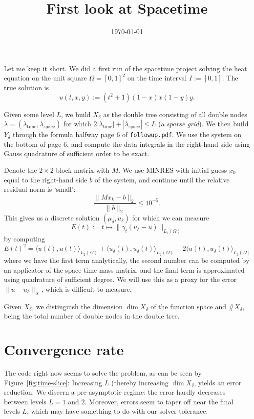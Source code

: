 \documentclass[11pt,a4paper]{amsart}
\date{\today}
\theoremstyle{definition}
\newcommand{\inp}[2]{\langle #1, #2 \rangle}
\begin{document}
\title{First look at Spacetime}
\maketitle

Let me keep it short. We did a first run of the spacetime project solving the
heat equation on the unit square $\Omega = [0,1]^2$ on the time interval
$I := [0,1]$. The true solution is 
\[
  u(t,x,y) := (t^2 + 1) (1-x)x(1-y)y.
\]

Given some level $L$, we build $X_\delta$ as the double tree consisting of all
double nodes $\lambda = (\lambda_{\text{time}}, \lambda_{\text{space}})$ for
which $2|\lambda_{\text{time}}| + |\lambda_{\text{space}}| \leq L$ (a \emph{sparse grid}).
We then build $Y_\delta$ through the formula halfway page 6 of \texttt{followup.pdf}.
We use the system on the bottom of page 6, and compute the data integrals in the
right-hand side using Gauss quadrature of sufficient order to be exact.

Denote the $2 \times 2$ block-matrix with $M$. We use MINRES with initial guess $x_0$
equal to the right-hand side $b$ of the system, and continue until the relative residual norm is `small':
\[
  \frac{\|Mx_k - b\|_2}{\|b\|_2} \leq 10^{-5}.
\]
This gives us a discrete solution $(\mu_\delta, u_\delta)$ for which we can measure
\[
  E(t) := t \mapsto \|\gamma_t(u_\delta - u)\|_{L_2(\Omega)}
\]
by computing
\[
  E(t)^2 = \inp{u(t)}{u(t)}_{L_2(\Omega)} + \inp{u_\delta(t)}{u_\delta(t)}_{L_2(\Omega)} - 2 \inp{u(t)}{u_\delta(t)}_{L_2(\Omega)}
\]
where we have the first term analytically, the second number can be computed by
an applicator of the space-time mass matrix, and the final term is approximated
using quadrature of sufficient degree. We will use this as a proxy for the error
$\|u - u_\delta\|_X$, which is difficult to measure.

Given $X_\delta$, we distinguish the dimension $\dim X_\delta$ of the function space
and $\# X_\delta$, being the total number of double nodes in the double tree.

\section*{Convergence rate}
The code right now seems to solve the problem, as can be seen by Figure~\ref{fig:time-slice}:
Increasing $L$ (thereby increasing $\dim X_\delta$, yields an error reduction.
We discern a pre-asymptotic regime: the error hardly decreases between levels $L=1$
and $2$. Moreover, errors seem to taper off near the final levels $L$, which may
have something to do with our solver tolerance.
\end{document}

